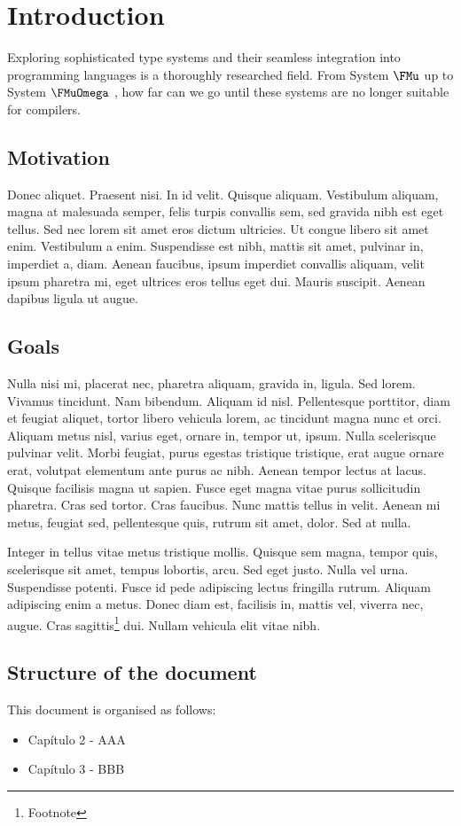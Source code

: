 \chapter{Introduction}
Exploring sophisticated type systems and their seamless integration into programming languages is a thoroughly researched field. From System $\FMu$ \cite{GauthierP04} up to System $\FMuOmega$ \cite{DBLP:conf/popl/CaiGO16}, how far can we go until these systems are no longer suitable for compilers.

\section{Motivation}
Donec aliquet. Praesent nisi. In id velit. Quisque aliquam. Vestibulum aliquam, magna at malesuada semper, felis turpis convallis sem, sed gravida nibh est eget tellus. Sed nec lorem sit amet eros dictum ultricies. Ut congue libero sit amet enim. Vestibulum a enim. Suspendisse est nibh, mattis sit amet, pulvinar in, imperdiet a, diam. Aenean faucibus, ipsum imperdiet convallis aliquam, velit ipsum pharetra mi, eget ultrices eros tellus eget dui. Mauris suscipit. Aenean dapibus ligula ut augue.

\section{Goals}
Nulla nisi mi, placerat nec, pharetra aliquam, gravida in, ligula. Sed lorem. Vivamus tincidunt. Nam bibendum. Aliquam id nisl. Pellentesque porttitor, diam et feugiat aliquet, tortor libero vehicula lorem, ac tincidunt magna nunc et orci. Aliquam metus nisl, varius eget, ornare in, tempor ut, ipsum. Nulla scelerisque pulvinar velit. Morbi feugiat, purus egestas tristique tristique, erat augue ornare erat, volutpat elementum ante purus ac nibh. Aenean tempor lectus at lacus. Quisque facilisis magna ut sapien. Fusce eget magna vitae purus sollicitudin pharetra. Cras sed tortor. Cras faucibus. Nunc mattis tellus in velit. Aenean mi metus, feugiat sed, pellentesque quis, rutrum sit amet, dolor. Sed at nulla.

Integer in tellus vitae metus tristique mollis. Quisque sem magna, tempor quis, scelerisque sit amet, tempus lobortis, arcu. Sed eget justo. Nulla vel urna. Suspendisse potenti. Fusce id pede adipiscing lectus fringilla rutrum. Aliquam adipiscing enim a metus. Donec diam est, facilisis in, mattis vel, viverra nec, augue. Cras sagittis\footnote{Footnote} dui. Nullam vehicula elit vitae nibh. 

\section{Structure of the document}
This document is organised as follows:
\begin{itemize}
	\item Capítulo 2 - AAA
	\item Capítulo 3 - BBB
\end{itemize}
